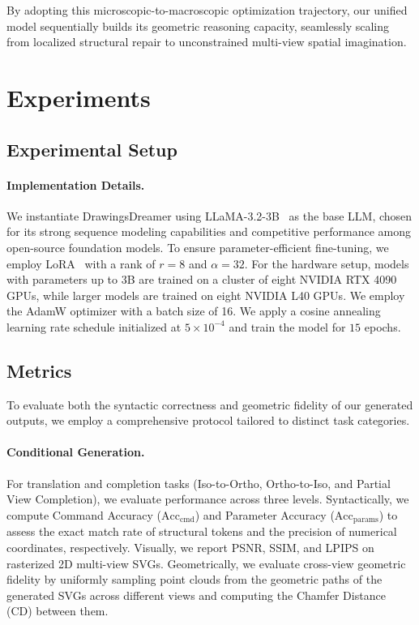 \documentclass{article}
\begin{document}
By adopting this microscopic-to-macroscopic optimization trajectory, our unified model sequentially builds its geometric reasoning capacity, seamlessly scaling from localized structural repair to unconstrained multi-view spatial imagination.






\section{Experiments} \label{sec: experiments}
\subsection{Experimental Setup} \label{sec: setup}
\paragraph{Implementation Details.}
We instantiate DrawingsDreamer using LLaMA-3.2-3B~\cite{meta2024introducing} as the base LLM, chosen for its strong sequence modeling capabilities and competitive performance among open-source foundation models. To ensure parameter-efficient fine-tuning, we employ LoRA~\cite{hu2022lora} with a rank of $r=8$ and $\alpha=32$. For the hardware setup, models with parameters up to 3B are trained on a cluster of eight NVIDIA RTX 4090 GPUs, while larger models are trained on eight NVIDIA L40 GPUs. We employ the AdamW optimizer \cite{loshchilov2017decoupled} with a batch size of 16.  We apply a cosine annealing learning rate schedule initialized at $5 \times 10^{-4}$ and train the model for $15$ epochs.

\subsection{Metrics}
\label{sec:metrics}
To evaluate both the syntactic correctness and geometric fidelity of our generated outputs, we employ a comprehensive protocol tailored to distinct task categories.

\paragraph{Conditional Generation.} For translation and completion tasks (Iso-to-Ortho, Ortho-to-Iso, and Partial View Completion), we evaluate performance across three levels. Syntactically, we compute Command Accuracy ($\text{Acc}_{\text{cmd}}$) and Parameter Accuracy ($\text{Acc}_{\text{params}}$) to assess the exact match rate of structural tokens and the precision of numerical coordinates, respectively. Visually, we report PSNR, SSIM, and LPIPS on rasterized 2D multi-view SVGs. Geometrically, we evaluate cross-view geometric fidelity by uniformly sampling point clouds from the geometric paths of the generated SVGs across different views and computing the Chamfer Distance (CD) between them.
\end{document}
